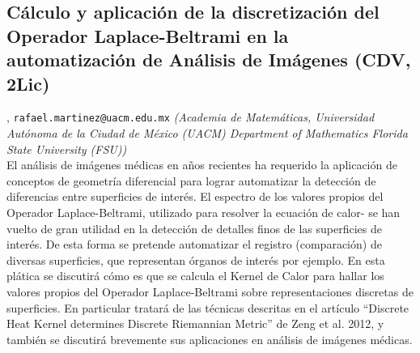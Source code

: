 \subsection{\sffamily C\'alculo y aplicaci\'on de la discretizaci\'on del Operador Laplace-Beltrami en la automatizaci\'on de An\'alisis de Im\'agenes {\footnotesize (CDV, 2Lic)}} \label{reg-984} 
, {\tt rafael.martinez@uacm.edu.mx}  {\slshape (Academia de Matem\'aticas, Universidad Aut\'onoma de la Ciudad de M\'exico (UACM)  Department of Mathematics Florida State University (FSU))}\\
          \noindent El an\'alisis de im\'agenes m\'edicas en a\~nos recientes ha requerido la aplicaci\'on de conceptos de geometr\'ia diferencial para lograr automatizar la detecci\'on de diferencias entre superficies de inter\'es. El espectro de los valores propios del Operador Laplace-Beltrami, utilizado para resolver la ecuaci\'on de calor- se han vuelto de gran utilidad en la detecci\'on de detalles finos de las superficies de inter\'es.  De esta forma se pretende automatizar el registro (comparaci\'on) de diversas superficies, que representan \'organos de inter\'es por ejemplo. En esta pl\'atica se discutir\'a c\'omo es que se calcula el Kernel de Calor para hallar los valores propios del Operador Laplace-Beltrami sobre representaciones discretas de superficies. En particular tratar\'a de las t\'ecnicas descritas en el art\'iculo ``Discrete Heat Kernel determines Discrete Riemannian Metric'' de Zeng et al. 2012, y tambi\'en se discutir\'a brevemente sus aplicaciones en an\'alisis de im\'agenes m\'edicas.
